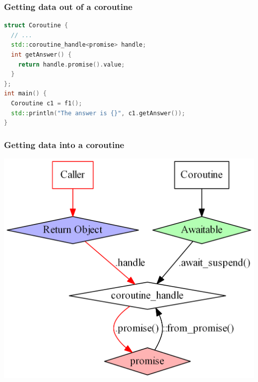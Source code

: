 \documentclass[aspectratio=169]{beamer}
\newif\iftransitions
\begin{document}
\iftransitions
\begin{frame}[fragile]
  \frametitle{Getting data out of a coroutine}
  
  \begin{lstlisting}[language={C++}]
struct Coroutine {
  // ...
  
  
  
  
};
int main() {
  Coroutine c1 = f1();
  std::println("The answer is {}", c1.getAnswer());
}
  \end{lstlisting}
\end{frame} 
\fi

\begin{frame}[fragile]
  \frametitle{Getting data out of a coroutine}
  
  \begin{lstlisting}[language={C++}]
struct Coroutine {
  // ...
  std::coroutine_handle<promise> handle;
  int getAnswer() {
    return handle.promise().value;
  }
};
int main() {
  Coroutine c1 = f1();
  std::println("The answer is {}", c1.getAnswer());
}
  \end{lstlisting}
\end{frame} 

\begin{frame}
  \frametitle{Getting data into a coroutine}
  
  \iftransitions \pause \fi
  
  \begin{center}
  \includegraphics[height=.9\textheight]{corogfx/path_in_010.png}
  \end{center}
  
\end{frame}
\end{document}
